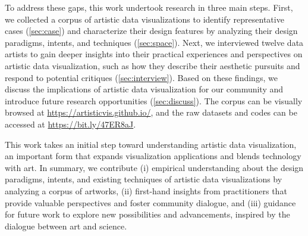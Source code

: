 To address these gaps, this work undertook research in three main steps. First, we collected a corpus of artistic data visualizations to identify representative cases (\autoref{sec:case}) and characterize their design features by analyzing their design paradigms, intents, and techniques (\autoref{sec:space}). Next, we interviewed twelve data artists to gain deeper insights into their practical experiences and perspectives on artistic data visualization, such as how they describe their aesthetic pursuits and respond to potential critiques (\autoref{sec:interview}).
Based on these findings, we discuss the implications of artistic data visualization for our community and introduce future research opportunities (\autoref{sec:discuss}). The corpus can be visually browsed at \url{https://artisticvis.github.io/}, and the raw datasets and codes can be accessed at \url{https://bit.ly/47ER8aJ}.

This work takes an initial step toward understanding artistic data visualization, an important form that expands visualization applications and blends technology with art. In summary, we contribute (i) empirical understanding about the design paradigms, intents, and existing techniques of artistic data visualizations by analyzing a corpus of artworks, (ii) first-hand insights from practitioners that provide valuable perspectives and foster community dialogue, and (iii) guidance for future work to explore new possibilities and advancements, inspired by the dialogue between art and science.
